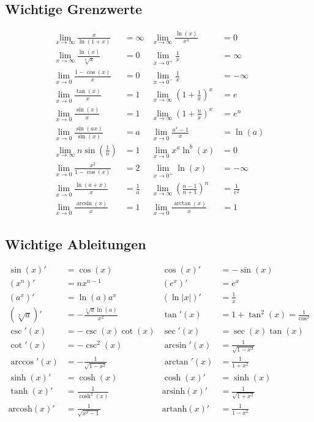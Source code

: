 \documentclass[8pt, a4paper, landscape, fleqn]{scrartcl}
\begin{document}
\begin{multicols*}{3}
			\subsection{Wichtige Grenzwerte}
					\vspace{-7pt}
					\begin{align*}
						\lim_{x \rightarrow \infty}\frac{x}{\ln(1+x)}&=\infty &\lim_{x \rightarrow \infty}\frac{\ln(x)}{x^n}&=0\\
						\lim_{x \rightarrow \infty}\frac{\ln(x)}{\sqrt[n]{x}}&=0 &\lim_{x \rightarrow 0^+}\frac{1}{x}&=\infty\\
						\lim_{x \rightarrow 0}\frac{1-\cos(x)}{x}&=0 &\lim_{x \rightarrow 0^-}\frac{1}{x}&=-\infty\\
						\lim_{x \rightarrow 0}\frac{\tan(x)}{x}&=1 &\lim_{x \rightarrow \infty}(1+\frac{1}{x})^x&=e\\
						\lim_{x \rightarrow 0}\frac{\sin(x)}{x}&=1 &\lim_{x \rightarrow \infty}(1+\frac{n}{x})^x&=e^n\\
						\lim_{x \rightarrow 0}\frac{\sin(ax)}{\sin(x)}&=a &\lim_{x \rightarrow 0}\frac{a^x-1}{x}&=\ln(a)\\
						\lim_{x \rightarrow \infty}n \sin(\frac{1}{n})&=1 &\lim_{x \rightarrow 0}x^a\ln^b(x)&=0\\
						\lim_{x \rightarrow 0}\frac{x^2}{1-\cos(x)}&=2 &\lim_{x \rightarrow 0^+}\ln(x)&=-\infty\\
						\lim_{x \rightarrow 0}\frac{\ln(a+x)}{x}&=\frac{1}{a} &\lim_{x \rightarrow \infty}(\frac{n-1}{n+1})^n&=\frac{1}{e^2}\\
						\lim_{x \rightarrow 0}\frac{\arcsin(x)}{x}&=1 &\lim_{x \rightarrow 0}\frac{\arctan(x)}{x}&=1
					\end{align*}	
			\subsection{Wichtige Ableitungen}
				\vspace{-7pt}
				\begin{align*}
				    \sin(x)'&=\cos(x) &\cos(x)'&=-\sin(x)\\
				    \left(x^n\right)'&=n x^{n-1} &(e^x)'&=e^x\\
					\left(a^x\right)'&=\ln(a)a^x &\left(\ln\vert x \vert \right)'&=\frac{1}{x}\\
					\left(\sqrt[x]{a}\right)'&=-\frac{\sqrt[x]{a}\ln(a)}{x^2}
					&\tan'(x)&=1+\tan^2(x)=\frac{1}{\cos^2}\\
					\csc'(x)&=-\csc(x)\cot(x) &\sec'(x)&=\sec(x)\tan(x)\\
					\cot'(x)&=-\csc^2(x) &\arcsin'(x)&=\frac{1}{\sqrt{1-x^2}}\\
					\arccos'(x)&=-\frac{1}{\sqrt{1-x^2}} &\arctan'(x)&=\frac{1}{1+x^2}\\
					\sinh(x)'&=\cosh(x) &\cosh(x)'&=\sinh(x)\\
					\tanh(x)'&=\frac{1}{\cosh^2(x)} &\text{arsinh}(x)'&=\frac{1}{\sqrt{1+x^2}}\\
					\text{arcosh}(x)'&=\frac{1}{\sqrt{x^2-1}} &\text{artanh}(x)'&=\frac{1}{1-x^2}
				\end{align*}

\end{multicols*}
\end{document}

